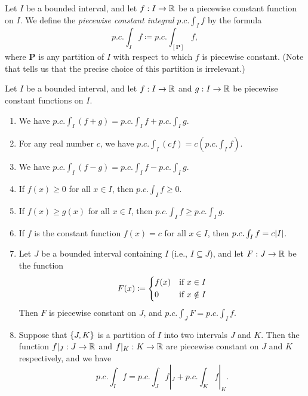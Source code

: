 \begin{defn}\label{i:11.2.14}
  Let \(I\) be a bounded interval, and let \(f : I \to \mathbb{R}\) be a piecewise constant function on \(I\).
  We define the \emph{piecewise constant integral} \(p.c. \int_I f\) by the formula
  \[
    p.c. \int_I f \coloneqq p.c. \int_{[\mathbf{P}]} f,
  \]
  where \(\mathbf{P}\) is any partition of \(I\) with respect to which \(f\) is piecewise constant.
  (Note that  tells us that the precise choice of this partition is irrelevant.)
\end{defn}

\setcounter{thm}{15}
\begin{thm}\label{i:11.2.16}
  Let \(I\) be a bounded interval, and let \(f : I \to \mathbb{R}\) and \(g : I \to \mathbb{R}\) be piecewise constant functions on \(I\).
  \begin{enumerate}
    \item\label{i:11.2.16.a} We have \(p.c. \int_I (f + g) = p.c. \int_I f + p.c. \int_I g\).
    \item\label{i:11.2.16.b} For any real number \(c\), we have \(p.c. \int_I (cf) = c (p.c. \int_I f)\).
    \item\label{i:11.2.16.c} We have \(p.c. \int_I (f - g) = p.c. \int_I f - p.c. \int_I g\).
    \item\label{i:11.2.16.d} If \(f(x) \geq 0\) for all \(x \in I\), then \(p.c. \int_I f \geq 0\).
    \item\label{i:11.2.16.e} If \(f(x) \geq g(x)\) for all \(x \in I\), then \(p.c. \int_I f \geq p.c. \int_I g\).
    \item\label{i:11.2.16.f} If \(f\) is the constant function \(f(x) = c\) for all \(x \in I\), then \(p.c. \int_I f = c \abs{I}\).
    \item\label{i:11.2.16.g} Let \(J\) be a bounded interval containing \(I\) (i.e., \(I \subseteq J\)), and let \(F : J \to \mathbb{R}\) be the function
    \[
      F(x) \coloneqq \begin{dcases}
        f(x) & \text{if } x \in I    \\
        0    & \text{if } x \notin I
      \end{dcases}
    \]
    Then \(F\) is piecewise constant on \(J\), and \(p.c. \int_J F = p.c. \int_I f\).
    \item\label{i:11.2.16.h} Suppose that \(\left\lbrace J, K\right\rbrace\) is a partition of \(I\) into two intervals \(J\) and \(K\).
    Then the function \(f|_J : J \to \mathbb{R}\) and \(f|_K : K \to \mathbb{R}\) are piecewise constant on \(J\) and \(K\) respectively, and we have
    \[
      p.c. \int_I f = p.c. \int_J f|_J + p.c. \int_K f|_K.
    \]
  \end{enumerate}
\end{thm}

